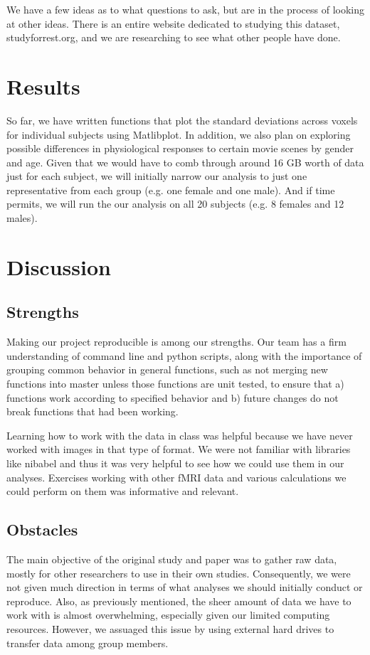 \documentclass[11pt]{article}
\begin{document}
We have a few ideas as to what questions to ask, but are in the process of
looking at other ideas.  There is an entire website dedicated to studying this
dataset, studyforrest.org, and we are researching to see what other people
have done.


\section{Results}

So far, we have written functions that plot the standard
deviations across voxels for individual subjects using Matlibplot. In
addition, we also plan on exploring possible differences in physiological
responses to certain movie scenes by gender and age. Given that we would have
to comb through around 16 GB worth of data just for each subject, we will
initially narrow our analysis to just one representative from each group (e.g.
one female and one male). And if time permits, we will run the our analysis on
all 20 subjects (e.g. 8 females and 12 males).


\section{Discussion}
\subsection{Strengths}

Making our project reproducible is among our strengths. Our team has a firm
understanding of command line and python scripts, along with the importance of
grouping common behavior in general functions, such as not merging new
functions into master unless those functions are unit tested, to ensure that
a) functions work according to specified behavior and b) future changes do not
break functions that had been working.

Learning how to work with the data in class was helpful because we have never
worked with images in that type of format. We were not familiar with libraries
like nibabel and thus it was very helpful to see how we could use them in our
analyses. Exercises working with other fMRI data and various calculations we
could perform on them was informative and relevant.


\subsection{Obstacles}

The main objective of the original study and paper was to gather raw data,
mostly for other researchers to use in their own studies. Consequently, we
were not given much direction in terms of what analyses we should initially
conduct or reproduce. Also, as previously mentioned, the sheer amount of data
we have to work with is almost overwhelming, especially given our limited
computing resources. However, we assuaged this issue by using external hard
drives to transfer data among group members.
\end{document}
